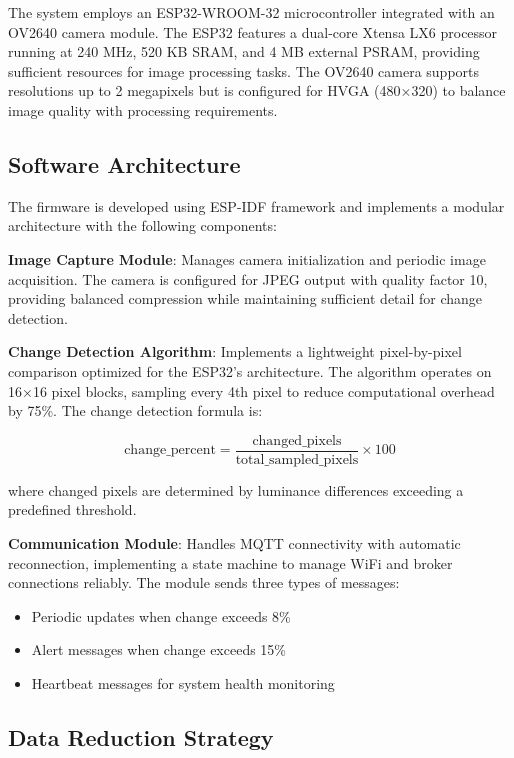 \documentclass[conference]{IEEEtran}
\begin{document}
The system employs an ESP32-WROOM-32 microcontroller integrated with an OV2640 camera module. The ESP32 features a dual-core Xtensa LX6 processor running at 240 MHz, 520 KB SRAM, and 4 MB external PSRAM, providing sufficient resources for image processing tasks. The OV2640 camera supports resolutions up to 2 megapixels but is configured for HVGA (480×320) to balance image quality with processing requirements.

\subsection{Software Architecture}

The firmware is developed using ESP-IDF framework and implements a modular architecture with the following components:

\textbf{Image Capture Module}: Manages camera initialization and periodic image acquisition. The camera is configured for JPEG output with quality factor 10, providing balanced compression while maintaining sufficient detail for change detection.

\textbf{Change Detection Algorithm}: Implements a lightweight pixel-by-pixel comparison optimized for the ESP32's architecture. The algorithm operates on 16×16 pixel blocks, sampling every 4th pixel to reduce computational overhead by 75\%. The change detection formula is:

\begin{equation}
\text{change\_percent} = \frac{\text{changed\_pixels}}{\text{total\_sampled\_pixels}} \times 100
\end{equation}

where changed pixels are determined by luminance differences exceeding a predefined threshold.

\textbf{Communication Module}: Handles MQTT connectivity with automatic reconnection, implementing a state machine to manage WiFi and broker connections reliably. The module sends three types of messages:
\begin{itemize}
\item Periodic updates when change exceeds 8\%
\item Alert messages when change exceeds 15\%
\item Heartbeat messages for system health monitoring
\end{itemize}

\subsection{Data Reduction Strategy}
\end{document}
